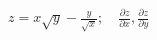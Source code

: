 \item $z = x \sqrt{y} - \frac{y}{\sqrt{x}}; \quad \frac{\partial z}{\partial x}, \frac{\partial z}{\partial y}$
